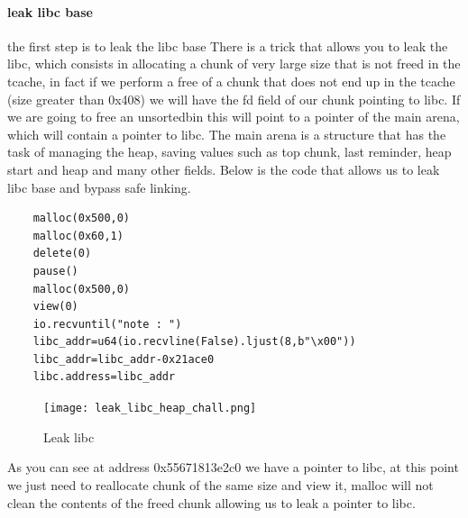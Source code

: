 \documentclass{report}
\begin{document}
    \paragraph{leak libc base}
    the first step is to leak the libc base \newline
    There is a trick that allows you to leak the libc, which consists in allocating a chunk of very large size that is not freed in the tcache, in fact if we perform a free of a chunk that does not end up in the tcache (size greater than 0x408) we will have the fd field of our chunk pointing to libc.\newline
    If we are going to free an unsortedbin this will point to a pointer of the main arena, which will contain a pointer to libc.\newline
    The main arena is a structure that has the task of managing the heap, saving values such as top chunk, last reminder, heap start and heap and many other fields.\newline
    \clearpage
    Below is the code that allows us to leak libc base and bypass safe linking.\newline

    \begin{verbatim}     
    malloc(0x500,0)
    malloc(0x60,1)
    delete(0)
    pause()
    malloc(0x500,0)
    view(0)
    io.recvuntil("note : ")
    libc_addr=u64(io.recvline(False).ljust(8,b"\x00"))
    libc_addr=libc_addr-0x21ace0
    libc.address=libc_addr
    \end{verbatim}
    \begin{figure}[htbp]
        \centering
        \texttt{[image: leak\_libc\_heap\_chall.png]}
        \caption{Leak libc}
        \label{fig:enter-label}
    \end{figure}
    As you can see at address 0x55671813e2c0 we have a pointer to libc, at this point we just need to reallocate chunk of the same size and view it, malloc will not clean the contents of the freed chunk allowing us to leak a pointer to libc. \newline
\end{document}
